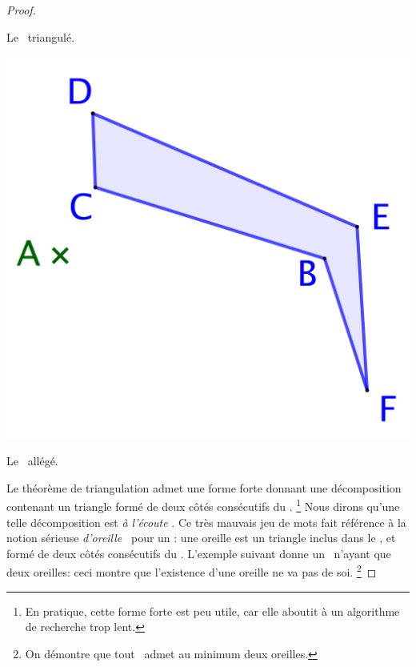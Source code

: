 \begin{proof}
\begin{multicols}{3}
\begin{center}
            \smallskip
            Le \ngone\ triangulé.
        \end{center}

    
        \begin{center}
            \includegraphics[scale=.4]{content/polygon/sufficient-cond/triangulation-3.png}
        
            \smallskip
            Le \ngone\ allégé.
        \end{center}
    \end{multicols}
    
    
    Le théorème de triangulation admet une forme forte donnant une décomposition contenant un triangle formé de deux côtés consécutifs du \ngone.%
    \footnote{
        En pratique, cette forme forte est peu utile, car elle aboutit à un algorithme de recherche trop lent.
    }
    Nous dirons qu'une telle décomposition est \og \emph{à l'écoute} \fg.
    Ce très mauvais jeu de mots fait référence à la notion sérieuse \og \emph{d'oreille} \fg\ pour un \ngone: une oreille est un triangle inclus dans le \ngone, et formé de deux côtés consécutifs du \ngone.
    L'exemple suivant donne un \ngone\ n'ayant que deux oreilles: ceci montre que l'existence d'une oreille ne va pas de soi.%
    \footnote{
        On démontre que tout \ngone\ admet au minimum deux oreilles.
    }



\end{proof}
